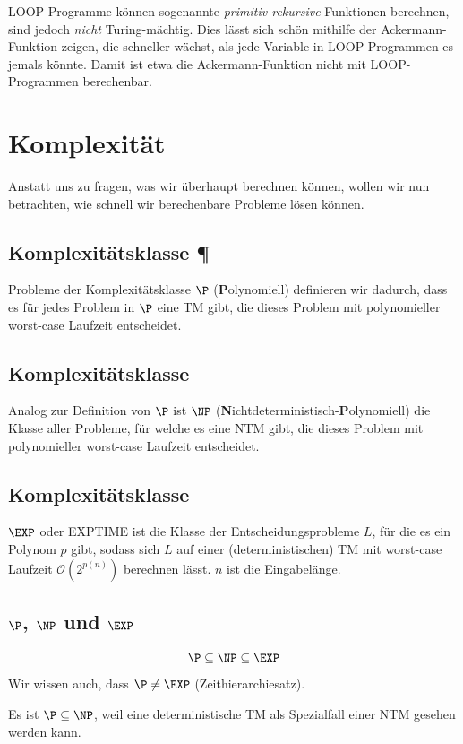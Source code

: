 \documentclass[a4paper,parskip=half*,DIV=7,fontsize=11pt]{scrartcl}
\begin{document}
LOOP-Programme können sogenannte \textit{primitiv-rekursive} Funktionen berechnen, sind jedoch \emph{nicht} Turing-mächtig. Dies lässt sich schön mithilfe der Ackermann-Funktion zeigen, die schneller wächst, als jede Variable in LOOP-Programmen es jemals könnte. Damit ist etwa die Ackermann-Funktion nicht mit LOOP-Programmen berechenbar.

\section{Komplexität}
Anstatt uns zu fragen, was wir überhaupt berechnen können, wollen wir nun betrachten, wie schnell wir berechenbare Probleme lösen können.

\subsection[Komplexitätsklasse P]{Komplexitätsklasse \P}
Probleme der Komplexitätsklasse $\P$ (\textbf Polynomiell) definieren wir dadurch, dass es für jedes Problem in $\P$ eine TM gibt, die dieses Problem mit polynomieller worst-case Laufzeit entscheidet.

\subsection[Komplexitätsklasse NP]{Komplexitätsklasse \NP}
Analog zur Definition von $\P$  ist $\NP$  (\textbf Nichtdeterministisch-\textbf Polynomiell) die Klasse aller Probleme, für welche es eine NTM gibt, die dieses Problem mit polynomieller worst-case Laufzeit entscheidet.

\subsection[Komplexitätsklasse EXP]{Komplexitätsklasse \EXP}
$\EXP$ oder EXPTIME ist die Klasse der Entscheidungsprobleme $L$, für die es ein Polynom $p$ gibt, sodass sich $L$ auf einer (deterministischen) TM mit worst-case Laufzeit $\mathcal{O}(2^{p(n)})$ berechnen lässt. $n$ ist die Eingabelänge.

\subsection[P, NP und EXP]{$\P$, $\NP$ und $\EXP$}
\[ \P \subseteq \NP \subseteq \EXP \]
Wir wissen auch, dass $\P \neq \EXP$ (Zeithierarchiesatz).

Es ist $\P \subseteq \NP$, weil eine deterministische TM als Spezialfall einer NTM gesehen werden kann.
\end{document}
